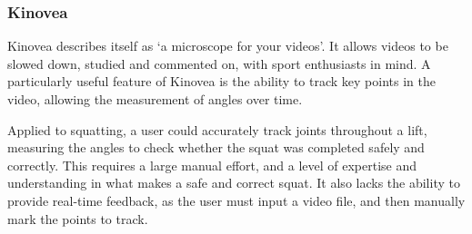 \subsubsection{Kinovea}

Kinovea\cite{kinovea} describes itself as `a microscope for your videos'. It allows videos to be slowed down, studied and commented on, with sport enthusiasts in mind. A particularly useful feature of Kinovea is the ability to track key points in the video, allowing the measurement of angles over time. 

Applied to squatting, a user could accurately track joints throughout a lift, measuring the angles to check whether the squat was completed safely and correctly. This requires a large manual effort, and a level of expertise and understanding in what makes a safe and correct squat. It also lacks the ability to provide real-time feedback, as the user must input a video file, and then manually mark the points to track.